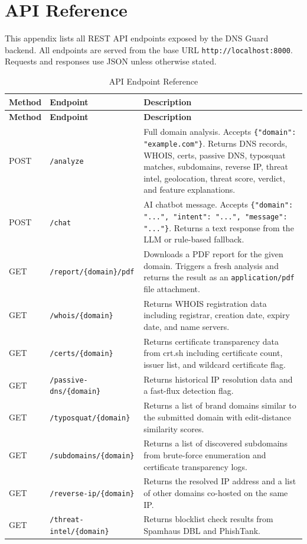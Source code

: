 \documentclass[12pt, a4paper, oneside]{report}
\begin{document}
\chapter{API Reference}
\label{app:api}

This appendix lists all REST API endpoints exposed by the DNS Guard backend. All endpoints are served from the base URL \texttt{http://localhost:8000}. Requests and responses use JSON unless otherwise stated.

\begin{longtable}{|p{1.5cm}|p{5.5cm}|p{7cm}|}
\caption{API Endpoint Reference}\\
\hline
\rowcolor{nfsuBlue!15}
\textbf{Method} & \textbf{Endpoint} & \textbf{Description} \\
\hline
\endfirsthead
\hline
\rowcolor{nfsuBlue!15}
\textbf{Method} & \textbf{Endpoint} & \textbf{Description} \\
\hline
\endhead
\hline
\endfoot
POST & \texttt{/analyze} & Full domain analysis. Accepts \texttt{\{"domain": "example.com"\}}. Returns DNS records, WHOIS, certs, passive DNS, typosquat matches, subdomains, reverse IP, threat intel, geolocation, threat score, verdict, and feature explanations. \\
\hline
POST & \texttt{/chat} & AI chatbot message. Accepts \texttt{\{"domain": "...", "intent": "...", "message": "..."\}}. Returns a text response from the LLM or rule-based fallback. \\
\hline
GET & \texttt{/report/\{domain\}/pdf} & Downloads a PDF report for the given domain. Triggers a fresh analysis and returns the result as an \texttt{application/pdf} file attachment. \\
\hline
GET & \texttt{/whois/\{domain\}} & Returns WHOIS registration data including registrar, creation date, expiry date, and name servers. \\
\hline
GET & \texttt{/certs/\{domain\}} & Returns certificate transparency data from crt.sh including certificate count, issuer list, and wildcard certificate flag. \\
\hline
GET & \texttt{/passive-dns/\{domain\}} & Returns historical IP resolution data and a fast-flux detection flag. \\
\hline
GET & \texttt{/typosquat/\{domain\}} & Returns a list of brand domains similar to the submitted domain with edit-distance similarity scores. \\
\hline
GET & \texttt{/subdomains/\{domain\}} & Returns a list of discovered subdomains from brute-force enumeration and certificate transparency logs. \\
\hline
GET & \texttt{/reverse-ip/\{domain\}} & Returns the resolved IP address and a list of other domains co-hosted on the same IP. \\
\hline
GET & \texttt{/threat-intel/\{domain\}} & Returns blocklist check results from Spamhaus DBL and PhishTank. \\
\hline
\end{longtable}
\end{document}
